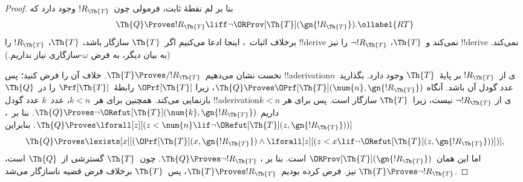 \documentclass[../../../include/open-logic-section]{subfiles}
\begin{document}
\begin{proof}
بنا بر لم نقطهٔ ثابت، فرمولی چون~$!R_\Th{T}$ وجود دارد که
\begin{equation}
  \Th{Q} \Proves !R_\Th{T} \liff \lnot \ORProv[\Th{T}](\gn{!R_\Th{T}}).
  \ollabel{RT}
\end{equation}
برخلاف اثبات~، اینجا ادعا می‌کنیم
اگر~$\Th{T}$ سازگار باشد، $\Th{T}$، $!R_\Th{T}$ را !!{derive}
نمی‌کند و~$\Th{T}$، $\lnot !R_\Th{T}$ را نیز !!{derive} نمی‌کند. (به
بیان دیگر، به فرض $\omega$-سازگاری نیاز نداریم.)

نخست نشان می‌دهیم~$\Th{T} \Proves/ !R_{\Th{T}}$. خلاف آن را فرض کنید؛
پس !!a{derivation}ی از~$!R_{\Th{T}}$ بر پایهٔ~$\Th{T}$ وجود دارد.
بگذارید~$n$ عدد گودل آن باشد. آنگاه
$\Th{Q} \Proves \OPrf[\Th{T}](\num{n}, \gn{!R_{\Th{T}}})$، زیرا
$\OPrf[\Th{T}]$ رابطهٔ~$\Prf[\Th{T}]$ را در~$\Th{Q}$ بازنمایی می‌کند.
همچنین برای هر~$k < n$، عدد~$k$ عدد گودل !!a{derivation}ی از
$\lnot !R_{\Th{T}}$ نیست، زیرا~$\Th{T}$ سازگار است. پس برای هر
$k < n$ داریم
$\Th{Q} \Proves \lnot \ORefut[\Th{T}](\num{k}, \gn{!R_{\Th{T}}})$.
بنا بر~،
$\Th{Q} \Proves \lforall[z][(z < \num{n} \lif \lnot \ORefut[\Th{T}](z,
  \gn{!R_{\Th{T}}}))]$. بنابراین
\[
\Th{Q} \Proves \lexists[x][(\OPrf[\Th{T}](x,\gn{!R_{\Th{T}}}) \land \lforall[z][(z
    < x \lif \lnot \ORefut[\Th{T}](z,\gn{!R_{\Th{T}}}))])],
\]
اما این همان~$\ORProv[\Th{T}](\gn{!R_{\Th{T}}})$ است. بنا بر
، $\Th{Q} \Proves \lnot !R_{\Th{T}}$. چون~$\Th{T}$ گسترشی
از~$\Th{Q}$ است، $\Th{T} \Proves \lnot !R_{\Th{T}}$ نیز. فرض کرده
بودیم~$\Th{T} \Proves !R_{\Th{T}}$، پس~$\Th{T}$ برخلاف فرض قضیه
ناسازگار می‌شد.


\end{proof}
\end{document}
